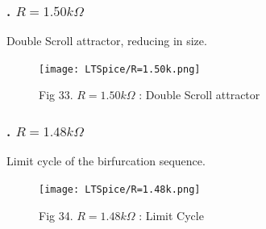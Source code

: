 \documentclass[12pt]{article}
\begin{document}
\subsubsection*{. $R=1.50k\Omega$}
Double Scroll attractor, reducing in size.
\begin{figure}[H] %
	\centering
	\texttt{[image: LTSpice/R=1.50k.png]}
	\caption{Fig 33. $R=1.50k\Omega$ : Double Scroll attractor}
\end{figure}
\subsubsection*{. $R=1.48k\Omega$}
Limit cycle of the birfurcation sequence.
\begin{figure}[H] %
	\centering
	\texttt{[image: LTSpice/R=1.48k.png]}
	\caption{Fig 34. $R=1.48k\Omega$ : Limit Cycle}
\end{figure}
\end{document}
